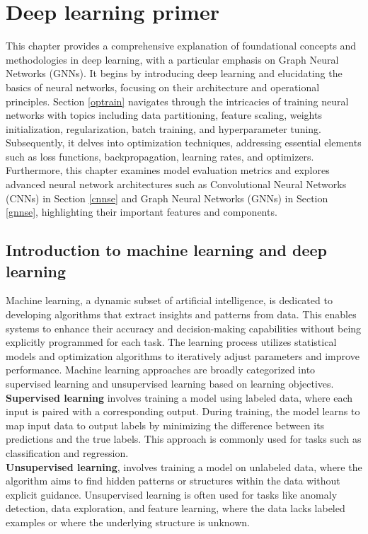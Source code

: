 \chapter{Deep learning primer}
\label{chap:Theory-Deep Learning}
This chapter provides a comprehensive explanation of foundational concepts and methodologies in deep learning, with a particular emphasis on Graph Neural Networks (GNNs). It begins by introducing deep learning and elucidating the basics of neural networks, focusing on their architecture and operational principles. Section \ref{optrain} navigates through the intricacies of training neural networks with topics including data partitioning, feature scaling, weights initialization, regularization, batch training, and hyperparameter tuning. Subsequently, it delves into optimization techniques, addressing essential elements such as loss functions, backpropagation, learning rates, and optimizers. Furthermore, this chapter examines model evaluation metrics and explores advanced neural network architectures such as Convolutional Neural Networks (CNNs) in Section \ref{cnnse} and Graph Neural Networks (GNNs) in Section \ref{gnnse}, highlighting their important features and components. 

\section{Introduction to machine learning and deep learning}
Machine learning, a dynamic subset of artificial intelligence, is dedicated to developing algorithms that extract insights and patterns from data. This enables systems to enhance their accuracy and decision-making capabilities without being explicitly programmed for each task. The learning process utilizes statistical models and optimization algorithms to iteratively adjust parameters and improve performance. Machine learning approaches are broadly categorized into supervised learning and unsupervised learning based on learning objectives. \\

\textbf{Supervised learning} involves training a model using labeled data, where each input is paired with a corresponding output. During training, the model learns to map input data to output labels by minimizing the difference between its predictions and the true labels. This approach is commonly used for tasks such as classification and regression. \\

\textbf{Unsupervised learning}, involves training a model on unlabeled data, where the algorithm aims to find hidden patterns or structures within the data without explicit guidance. Unsupervised learning is often used for tasks like anomaly detection, data exploration, and feature learning, where the data lacks labeled examples or where the underlying structure is unknown. \\

